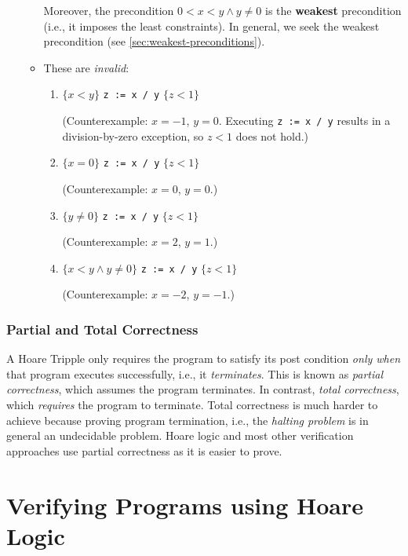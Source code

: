 \documentclass[oneside,11pt,dvipsnames]{book}
\begin{document}
\begin{enumerate}
\begin{itemize}
        Moreover, the precondition \( 0 < x < y \land y \neq 0 \) is the \textbf{weakest} precondition (i.e., it imposes the least constraints). In general, we seek the weakest precondition (see \autoref{sec:weakest-preconditions}).
  
    \item These are \emph{invalid}:
  
    \begin{enumerate}
    \item
      \( \{ x < y \} \) \texttt{z := x / y} \( \{ z < 1 \} \)
  
      (Counterexample: \( x = -1 \), \( y = 0 \). Executing \texttt{z := x / y} results in a division-by-zero exception, so \( z < 1 \) does not hold.)
    \item
      \( \{ x = 0 \} \) \texttt{z := x / y} \( \{ z < 1 \} \)
  
      (Counterexample: \( x = 0 \), \( y = 0 \).)
    \item
      \( \{ y \neq 0 \} \) \texttt{z := x / y} \( \{ z < 1 \} \)
  
      (Counterexample: \( x = 2 \), \( y = 1 \).)
    \item
      \( \{ x < y \land y \neq 0 \} \) \texttt{z := x / y} \( \{ z < 1 \} \)
  
      (Counterexample: \( x = -2 \), \( y = -1 \).)
    \end{enumerate}
\end{itemize}

\end{enumerate}



\subsubsection{Partial and Total Correctness} A Hoare Tripple only requires the program to satisfy its post condition \emph{only when} that program executes successfully, i.e., it \emph{terminates}. This is known as \emph{partial correctness}, which {assumes} the program terminates. In contrast, \emph{total correctness}, which \emph{requires} the program to terminate.  Total correctness is much harder to achieve because proving program termination, i.e., the \emph{halting problem} is in general an undecidable problem.  Hoare logic and most other verification approaches use partial correctness as it is easier to prove.  

\section{Verifying Programs using Hoare Logic}\label{sec:verification-hoare}
\end{document}
